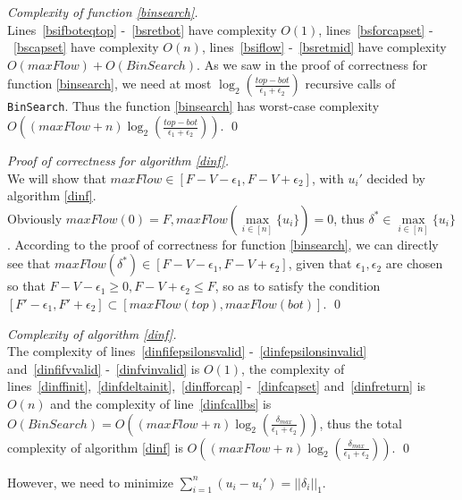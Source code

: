 \documentclass[11pt]{llncs}
\begin{document}
    \begin{proof}[Complexity of function \ref{binsearch}] \ \\
       Lines~\ref{bsifboteqtop} -~\ref{bsretbot} have complexity $O(1)$, lines~\ref{bsforcapset} -~\ref{bscapset} have
       complexity $O(n)$, lines~\ref{bsiflow} -~\ref{bsretmid} have complexity $O(maxFlow) + O(BinSearch)$. As we saw in the
       proof of correctness for function \ref{binsearch}, we need at most $\log_2(\frac{top - bot}{\epsilon_1 +
       \epsilon_2})$ recursive calls of \texttt{BinSearch}. Thus the function \ref{binsearch} has worst-case complexity
       $O((maxFlow + n)\log_2(\frac{top - bot}{\epsilon_1 + \epsilon_2}))$. \qed
    \end{proof}
    \begin{proof}[Proof of correctness for algorithm \ref{dinf}] \ \\
       We will show that $maxFlow \in [F - V - \epsilon_1, F - V + \epsilon_2]$, with $u_i'$ decided by algorithm
       \ref{dinf}. \\
       Obviously $maxFlow(0) = F, maxFlow(\max\limits_{i \in [n]}\{u_i\}) = 0$, thus $\delta^* \in
       \max\limits_{i \in [n]}\{u_i\}$. According to the proof of correctness for function \ref{binsearch},
       we can directly see that $maxFlow(\delta^*) \in [F - V - \epsilon_1, F - V + \epsilon_2]$, given that
       $\epsilon_1, \epsilon_2$ are chosen so that $F - V - \epsilon_1 \geq 0, F - V + \epsilon_2 \leq F$, so as to satisfy
       the condition $[F' - \epsilon_1, F' + \epsilon_2] \subset [maxFlow(top),maxFlow(bot)]$. \qed
    \end{proof}
    \begin{proof}[Complexity of algorithm \ref{dinf}] \ \\
       The complexity of lines~\ref{dinfifepsilonsvalid} -~\ref{dinfepsilonsinvalid} and~\ref{dinfifvvalid}
       -~\ref{dinfvinvalid} is $O(1)$, the complexity of lines~\ref{dinffinit},~\ref{dinfdeltainit},~\ref{dinfforcap}
       -~\ref{dinfcapset} and~\ref{dinfreturn} is $O(n)$ and the complexity of line~\ref{dinfcallbs} is $O(BinSearch) =
       O((maxFlow + n) \log_2(\frac{\delta_{max}}{\epsilon_1 + \epsilon_2}))$, thus the total complexity of algorithm
       \ref{dinf} is $O((maxFlow + n)\log_2(\frac{\delta_{max}}{\epsilon_1 + \epsilon_2}))$. \qed
    \end{proof}

    However, we need to minimize $\sum\limits_{i=1}^{n}(u_i-u_i') = ||\delta_i||_1$.
\end{document}
